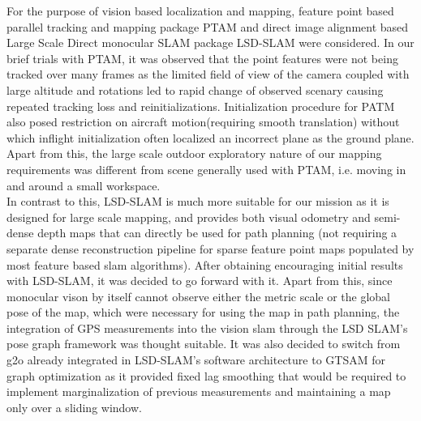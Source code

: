 For the purpose of vision based localization and mapping, feature point based parallel tracking and mapping package PTAM\cite{Klein:2007:PTM:1514339.1514363} and direct image alignment based Large Scale Direct monocular SLAM package LSD-SLAM\cite{engel14eccv} were considered. In our brief trials with PTAM, it was observed that the point features were not being tracked over many frames as the limited field of view of the camera coupled with large altitude and rotations led to rapid change of observed scenary causing repeated tracking loss and reinitializations. Initialization procedure for PATM also posed restriction on aircraft motion(requiring smooth translation) without which inflight initialization often localized an incorrect plane as the ground plane. Apart from this, the large scale outdoor exploratory nature of our mapping requirements was different from scene generally used with PTAM, i.e. moving in and around a small workspace\cite{Klein:2007:PTM:1514339.1514363}.\\
In contrast to this, LSD-SLAM is much more suitable for our mission as it is designed for large scale mapping, and provides both visual odometry and semi-dense depth maps that can directly be used for path planning (not requiring a separate dense reconstruction pipeline for sparse feature point maps populated by most feature based slam algorithms). After obtaining encouraging initial results with LSD-SLAM, it was decided to go forward with it. Apart from this, since monocular vison by itself cannot observe either the metric scale or the global pose of the map, which were necessary for using the map in path planning, the integration of GPS measurements into the vision slam through the LSD SLAM's pose graph framework was thought suitable. It was also decided to switch from g2o\cite{5979949} already integrated in LSD-SLAM's software architecture to GTSAM\cite{gtsam} for graph optimization as it provided fixed lag smoothing that would be required to implement marginalization of previous measurements and maintaining a map only over a sliding window.

